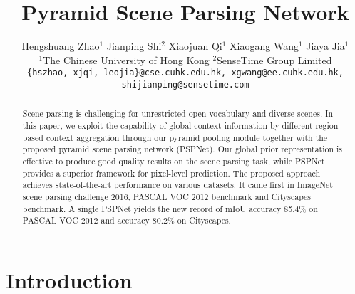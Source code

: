 \documentclass[10pt,twocolumn,letterpaper]{article}
\newcommand{\jpshi}[1]{{{\color{blue} Jianping: #1}}}
\begin{document}
\title{Pyramid Scene Parsing Network}


\author{
Hengshuang Zhao$^{1}$ \quad Jianping Shi$^{2}$ \quad Xiaojuan Qi$^{1}$ \quad Xiaogang Wang$^{1}$ \quad Jiaya Jia$^{1}$\\
$^{1}$The Chinese University of Hong Kong \quad $^{2}$SenseTime Group Limited\\
{\tt\small \{hszhao, xjqi, leojia\}@cse.cuhk.edu.hk, xgwang@ee.cuhk.edu.hk, shijianping@sensetime.com}}

\maketitle

\begin{abstract}
Scene parsing is challenging for unrestricted open vocabulary and diverse scenes. In this
paper, we exploit the capability of global context information by different-region-based
context aggregation through our pyramid pooling module together with the proposed pyramid
scene parsing network (PSPNet). Our global prior representation is effective to produce
good quality results on the scene parsing task, while PSPNet provides a superior
framework for pixel-level prediction. The proposed approach achieves state-of-the-art
performance on various datasets. It came first in ImageNet scene parsing challenge 2016,
PASCAL VOC 2012 benchmark and Cityscapes benchmark. A single PSPNet yields the new record
of mIoU accuracy 85.4\% on PASCAL VOC 2012 and accuracy 80.2\% on Cityscapes.
\end{abstract}


\section{Introduction}
\end{document}
